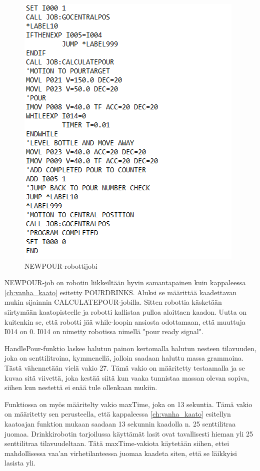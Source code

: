 \begin{figure}[h]
\begin{center}
\includegraphics[scale=0.8]{img/NEWPOUR.png}
\end{center}
\caption{NEWPOUR-robottijobi}
\label{fig:NEWPOUR}
\end{figure}

NEWPOUR-job on robotin liikkeiltään hyvin samantapainen kuin kappaleessa \ref{ch:vanha_kaato} esitetty POURDRINKS. Aluksi se määrittää kaadettavan mukin sijainnin CALCULATEPOUR-jobilla. Sitten robottia käsketään siirtymään kaatopisteelle ja robotti kallistaa pulloa aloittaen kaadon. Uutta on kuitenkin se, että robotti jää while-loopin ansiosta odottamaan, että muuttuja I014 on 0. I014 on nimetty robotissa nimellä "pour ready signal".

HandlePour-funktio laskee halutun painon kertomalla halutun nesteen tilavuuden, joka on senttilitroina, kymmenellä, jolloin saadaan haluttu massa grammoina. Tästä vähennetään vielä vakio 27. Tämä vakio on määritetty testaamalla ja se kuvaa sitä viivettä, joka kestää siitä kun vaaka tunnistaa massan olevan sopiva, siihen kun nestettä ei enää tule ollenkaan mukiin.

Funktiossa on myös määritelty vakio maxTime, joka on 13 sekuntia. Tämä vakio on määritetty sen perusteella, että kappaleessa \ref{ch:vanha_kaato} esitellyn kaatoajan funktion mukaan saadaan 13 sekunnin kaadolla n. 25 senttilitraa juomaa. Drinkkirobotin tarjoilussa käyttämät lasit ovat tavallisesti hieman yli 25 senttilitraa tilavuudeltaan. Tätä maxTime-vakiota käytetään siihen, ettei mahdollisessa vaa'an virhetilanteessa juomaa kaadeta siten, että se läikkyisi lasista yli.

